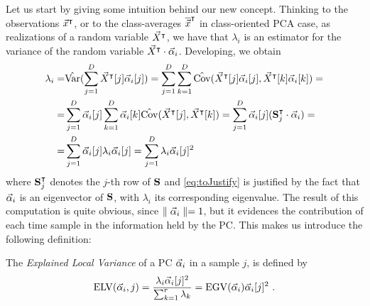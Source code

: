 %
Let us start by giving some intuition behind our new concept. Thinking to the observations ${\vec{x}}^\intercal$, or to the class-averages ${\overline{\vec{x}}}^\intercal$ in class-oriented PCA case, as realizations of a random variable $\vec{X}^\intercal$, we have that $\lambda_i$ is an estimator for the variance of the random variable $\vec{X}^\intercal\cdot\vec{\alpha}_i$. Developing, we obtain
\begin{align}\label{eq:ELV}
\lambda_i =& \hat{\mathrm{Var}}(\sum_{j=1}^D \vec{X}^\intercal[j]\vec{\alpha}_i[j]) = \sum_{j=1}^D\sum_{k=1}^D \hat{\mathrm{Cov}}(\vec{X}^\intercal[j]\vec{\alpha}_i[j], \vec{X}^\intercal[k]\vec{\alpha}_i[k])=\\
=& \sum_{j=1}^D \vec{\alpha}_i[j]\sum_{k=1}^D\vec{\alpha}_i[k]\hat{\mathrm{Cov}}(\vec{X}^\intercal[j], \vec{X}^\intercal[k])= \sum_{j=1}^D \vec{\alpha}_i[j] (\textbf{S}_{j}^\intercal \cdot \vec{\alpha}_i)=  \\
=& \sum_{j=1}^D \vec{\alpha}_i[j] \lambda_i\vec{\alpha}_i[j]= \sum_{j=1}^D  \lambda_i \vec{\alpha}_i[j]^2 \label{eq:toJustify}
\end{align}
where $\textbf{S}_{j}^\intercal$ denotes the $j$-th row of $\textbf{S}$ and \eqref{eq:toJustify} is justified by the fact that $\vec{\alpha}_i$ is an eigenvector of $\textbf{S}$, with $\lambda_i$ its corresponding eigenvalue. The result of this computation is quite obvious, since $\parallel \vec{\alpha}_i\parallel=1$, but it evidences the contribution of each time sample in the information held by the PC. This makes us introduce the following definition:
\begin{definition}


The {\em Explained Local Variance} of a PC $\vec{\alpha}_i$ in a sample $j$, is defined by
\begin{equation}
\mathrm{ELV}(\vec{\alpha}_i,j) = \frac{\lambda_i \vec{\alpha}_i[j]^2}{\sum_{k=1}^r\lambda_k} = \mathrm{EGV}(\vec{\alpha}_i) \vec{\alpha}_i[j]^2  \mbox{ .}
\end{equation}
\end{definition}
